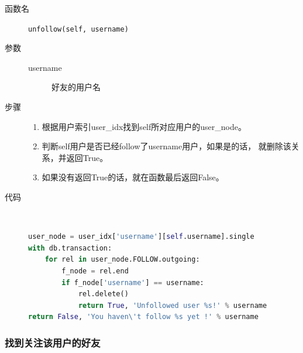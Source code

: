 \documentclass{yaldc}
\begin{document}
\begin{description}
    \item[函数名] \verb|unfollow(self, username)|
    \item[参数]
        \begin{description}
            \item[username] 好友的用户名
        \end{description}
    \item[步骤]
        \begin{enumerate}
            \item 根据用户索引user\_idx找到self所对应用户的user\_node。
            \item 判断self用户是否已经follow了username用户，如果是的话，
                就删除该关系，并返回True。
            \item 如果没有返回True的话，就在函数最后返回False。
        \end{enumerate}
    \item[代码] ~
        \begin{lstlisting}[language=Python]
user_node = user_idx['username'][self.username].single
with db.transaction:
    for rel in user_node.FOLLOW.outgoing:
        f_node = rel.end
        if f_node['username'] == username:
            rel.delete()
            return True, 'Unfollowed user %s!' % username
return False, 'You haven\'t follow %s yet !' % username
        \end{lstlisting}
\end{description}

\subsubsection{找到关注该用户的好友}
\end{document}
